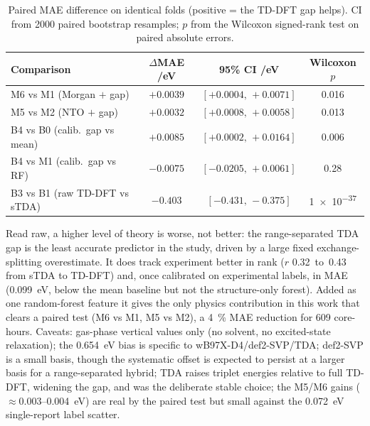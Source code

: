 \documentclass[twoside,twocolumn,9pt]{extarticle}
\begin{document}
\begin{table}[htbp]
  \centering
  \caption{Paired MAE difference on identical folds (positive = the TD-DFT gap
    helps). CI from \num{2000} paired bootstrap resamples; $p$ from the Wilcoxon
    signed-rank test on paired absolute errors.}
  \label{tab:tddft_paired}
  \small
  \begin{tabular}{lccc}
    \toprule
    Comparison & $\Delta$MAE /eV & 95\% CI /eV & Wilcoxon $p$ \\
    \midrule
    M6 vs M1 (Morgan $+$ gap)      & $+0.0039$ & $[+0.0004,\,+0.0071]$ & 0.016 \\
    M5 vs M2 (NTO $+$ gap)         & $+0.0032$ & $[+0.0008,\,+0.0058]$ & 0.013 \\
    B4 vs B0 (calib.\ gap vs mean) & $+0.0085$ & $[+0.0002,\,+0.0164]$ & 0.006 \\
    B4 vs M1 (calib.\ gap vs RF)   & $-0.0075$ & $[-0.0205,\,+0.0061]$ & 0.28 \\
    B3 vs B1 (raw TD-DFT vs sTDA)  & $-0.403$  & $[-0.431,\,-0.375]$   & \num{1e-37} \\
    \bottomrule
  \end{tabular}
\end{table}

Read raw, a higher level of theory is worse, not better: the range-separated
TDA gap is the least accurate predictor in the study, driven by a large
fixed exchange-splitting overestimate. It does track experiment better in rank
($r$ \num{0.32}~to~\num{0.43} from sTDA to TD-DFT) and, once calibrated on
experimental labels, in MAE (\qty{0.099}{\electronvolt}, below the mean baseline
but not the structure-only forest). Added as one random-forest feature it gives
the only physics contribution in this work that clears a paired test
(M6 vs M1, M5 vs M2), a \qty{4}{\percent} MAE reduction for \num{609}
core-hours. Caveats: gas-phase vertical values only (no solvent, no
excited-state relaxation); the \qty{+0.654}{\electronvolt} bias is specific to
wB97X-D4/def2-SVP/TDA; def2-SVP is a small basis, though the systematic offset
is expected to persist at a larger basis for a range-separated hybrid; TDA raises triplet
energies relative to full TD-DFT, widening the gap, and was the deliberate stable
choice; the M5/M6 gains ($\approx$\qty{0.003}{}--\qty{0.004}{\electronvolt}) are
real by the paired test but small against the \qty{0.072}{\electronvolt}
single-report label scatter.

\end{document}
